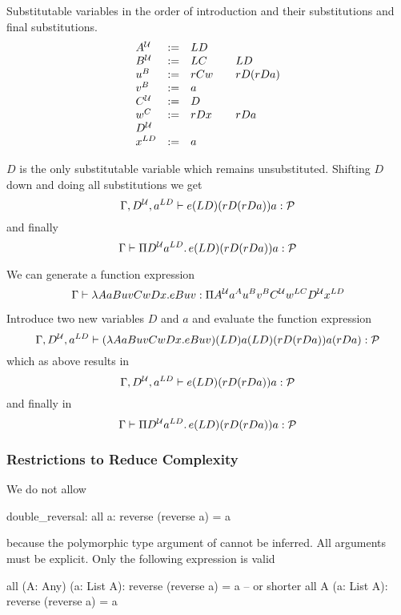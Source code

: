 Substitutable variables in the order of introduction and their substitutions
and final substitutions.
$$
\begin{array}{llll}
  A^{\cal{U}} &:=& L D
  \\
  B^{\cal{U}} &:=& L C    &\quad L D
  \\
  u^B   &:=& r C w  &\quad  r D (r D a)
  \\
  v^B    &:=& a
  \\
  C^{\cal{U}} &:=& D
  \\
  w^C    &:=& r D x &\quad  r D a
  \\
  D^{\cal{U}}
  \\
  x^{L D} &:=& a
\end{array}
$$

$D$ is the only substitutable variable which remains unsubstituted. Shifting
$D$ down and doing all substitutions we get
$$
\Gamma, D^{\cal{U}}, a^{L D} \vdash e (L D) (r D (r D a)) a : {\cal{P}}
$$
%
and finally
$$
\Gamma \vdash \Pi D^{\cal{U}} a^{L D} .\, e (L D) (r D (r D a)) a : {\cal{P}}
$$
%


We can generate a function expression
$$
\Gamma \vdash \lambda A a B u v C w D x. e B u v
: \Pi A^{\cal{U}} a^A u^B v^B C^{\cal{U}} w^{L C} D^{\cal{U}} x^{L D}
$$


Introduce two new variables $D$ and $a$ and evaluate the function expression
$$
\Gamma, D^{\cal{U}}, a^{L D} \vdash (\lambda A a B u v C w D x. e B u v) (L D) a (L
D) (r D (r D a)) a (r D a) : {\cal{P}}
$$
which as above results in
$$
\Gamma, D^{\cal{U}}, a^{L D} \vdash e (L D) (r D (r D a)) a : {\cal{P}}
$$
and finally in
$$
\Gamma \vdash \Pi D^{\cal{U}} a^{L D} .\, e (L D) (r D (r D a)) a : {\cal{P}}
$$


\subsubsection{Restrictions to Reduce Complexity}

We do not allow
\begin{alba}
  double_reversal: all a: reverse (reverse a) = a
\end{alba}

because the polymorphic type argument of  cannot be inferred.
All arguments must be explicit. Only the following expression is valid

\begin{alba}
  all (A: Any) (a: List A): reverse (reverse a) = a
  -- or shorter
  all A (a: List A): reverse (reverse a) = a
\end{alba}


